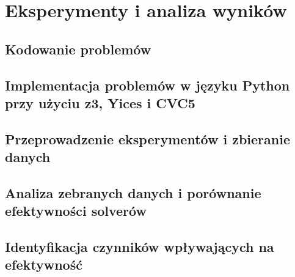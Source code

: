 \chapter{Eksperymenty i analiza wyników}

\section{Kodowanie problemów}

\section{Implementacja problemów w języku Python przy użyciu z3, Yices i CVC5}

\section{Przeprowadzenie eksperymentów i zbieranie danych}

\section{Analiza zebranych danych i porównanie efektywności solverów}

\section{Identyfikacja czynników wpływających na efektywność}

